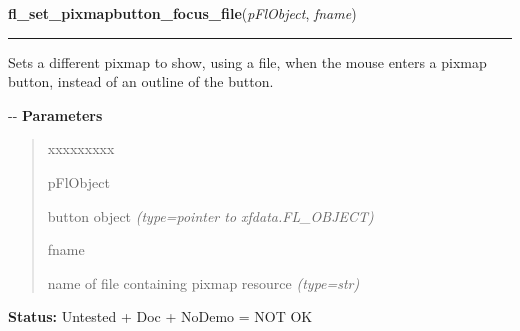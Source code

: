\hspace{.8\funcindent}\begin{boxedminipage}{\funcwidth}

    \raggedright \textbf{fl\_set\_pixmapbutton\_focus\_file}(\textit{pFlObject}, \textit{fname})

    \vspace{-1.5ex}

    \rule{\textwidth}{0.5\fboxrule}
\setlength{\parskip}{2ex}

Sets a different pixmap to show, using a file, when the mouse enters
a pixmap button, instead of an outline of the button.

-{}-
\setlength{\parskip}{1ex}
      \textbf{Parameters}
      \vspace{-1ex}

      \begin{quote}
        \begin{Ventry}{xxxxxxxxx}

          \item[pFlObject]


button object
            {\it (type=pointer to xfdata.FL\_OBJECT)}

          \item[fname]


name of file containing pixmap resource
            {\it (type=str)}

        \end{Ventry}

      \end{quote}

\textbf{Status:} 
Untested + Doc + NoDemo = NOT OK


    \end{boxedminipage}

    \label{xformslib:flbutton:fl_set_pixmapbutton_focus_pixmap}

    \vspace{0.5ex}

